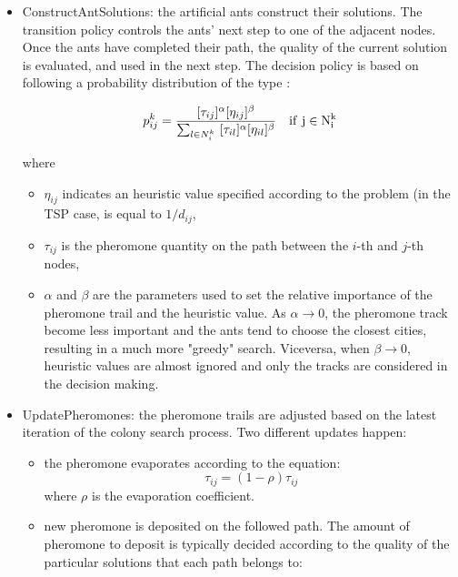 \begin{itemize}
\item ConstructAntSolutions:
the  artificial  ants  construct  their  solutions.  The transition policy controls  the  ants’  next step to one of the adjacent nodes. Once the ants have completed  their  path,  the quality  of  the current solution is evaluated,  and used in the next step. 
The decision policy is based on following a probability distribution of the type \cite{cinque}:

\begin{equation}
p_{ij}^k=  \frac{[\tau_{ij}]^{\alpha}[\eta_{ij}]^{\beta}}{\sum_{l \in N_i^k} ~  [\tau_{il}]^{\alpha}[\eta_{il}]^{\beta}} ~~~\rm{if} ~j \in N_i^k
\end{equation}

where 
\begin{itemize}

\item $\eta_{ij}$ indicates an heuristic value specified according to the problem (in the TSP case, is equal to $1/d_{ij}$,
\item  $\tau_{ij}$ is the pheromone quantity on the path between the $i$-th and $j$-th nodes,
\item $\alpha$ and $\beta$ are the parameters used to set the relative importance of the pheromone trail and the heuristic  value.
As $\alpha \rightarrow 0$,  the pheromone  track become  less  important  and  the  ants tend  to choose the closest cities, resulting in a much more "greedy" search. 
Viceversa, when $\beta \rightarrow 0$, heuristic values are almost ignored and only the tracks are considered in the decision making.  
\end{itemize}
\item UpdatePheromones:  the   pheromone   trails   are   adjusted   based   on   the   latest iteration of  the  colony search process.  
Two different updates happen: 
\begin{itemize}
\item the pheromone  evaporates according to the equation:
\begin{equation}
\tau_{ij}= (1-\rho) \tau_{ij}
\end{equation} 
where $\rho$ is the evaporation coefficient.

\item new pheromone is deposited on the followed path.  The  amount  of  pheromone  to  deposit  is  typically decided  according  to  the  quality  of  the particular  solutions  that  each  path  belongs  to:


\end{itemize}
\end{itemize}
